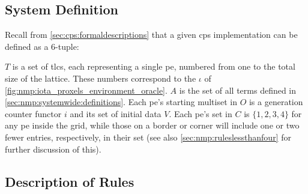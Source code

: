 \subsection{System Definition}
Recall from \cref{sec:cps:formaldescriptions} that a given \gls{cps} implementation can be defined as a 6-tuple:


\(T\) is a set of \glspl{tlc}, each representing a single \gls{pe}, numbered from one to the total size of the lattice.  These numbers correspond to the \(\iota\) of \cref{fig:nmp:iota_proxels_environment_oracle}.  \(A\) is the set of all terms defined in \cref{sec:nmp:systemwide:definitions}.  Each \gls{pe}'s starting multiset in \(O\) is a generation counter functor \(i\) and its set of initial data \(V\).  Each \gls{pe}'s set in \(C\) is \(\{1, 2, 3, 4\}\) for any \gls{pe} inside the grid, while those on a border or corner will include one or two fewer entries, respectively, in their set (see also \cref{sec:nmp:ruleslessthanfour} for further discussion of this).

\subsection{\label{sec:nmp:systemwide:rulesdesc}Description of Rules}

